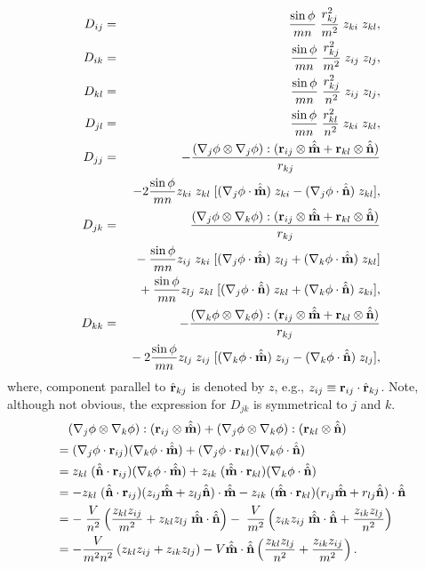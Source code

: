 \documentclass{article}
\begin{document}
\begin{eqnarray}
D_{ij} 
&=& \frac {\sin \phi} {mn} \; \frac {r_{kj}^2} {m^2} \;
  z_{ki} \; z_{kl}, \\
%
D_{ik} 
&=&  \frac {\sin \phi} {mn} \; \frac {r_{kj}^2} {m^2} \; 
  z_{ij} \; z_{lj}, \\
%
D_{kl}
&=& \frac {\sin \phi} {mn} \; \frac {r_{kj}^2}{n^2} \; 
  z_{ij} \; z_{lj} , \\
%
D_{jl}
&=& \frac {\sin \phi} {mn} \; \frac {r_{kl}^2} {n^2} \;
  z_{ki} \; z_{kl} , \\
%
D_{jj} 
&=& - \frac{
    (\djphi \otimes \djphi)  : 
    (\vr_{ij} \otimes \vmhh + \vr_{kl} \otimes \vnhh)
  } {r_{kj}} \nonumber \\
& & - 2 \frac {\sin \phi} {mn}  
  z_{ki} \; z_{kl} \;
  [
    (\djphi \cdot \vmhh) \; z_{ki}
   -(\djphi \cdot \vnhh) \; z_{kl}
  ], \\
%
D_{jk} 
&=&
\frac{ 
    (\djphi \otimes \dkphi)  : 
    (\vr_{ij} \otimes \vmhh + \vr_{kl} \otimes \vnhh)
} {r_{kj}} \nonumber \\
& & 
{} -\frac {\sin \phi} {mn}
  z_{ij} \; z_{ki} \;
  [
    (\djphi \cdot \vmhh) \; z_{lj}
   +(\dkphi \cdot \vmhh) \; z_{kl}
  ] \nonumber \\
& &
 {} +\frac {\sin \phi} {mn}
  z_{lj} \; z_{kl} \;
  [
    (\djphi \cdot \vnhh) \; z_{kl}
   +(\dkphi \cdot \vnhh) \; z_{ki}
  ], \\
%
D_{kk}
&=& - \frac{
    (\dkphi \otimes \dkphi)  : 
    (\vr_{ij} \otimes \vmhh + \vr_{kl} \otimes \vnhh)
  } {r_{kj}} \nonumber \\
& & {}- 2 \frac {\sin \phi} {mn}  
  z_{lj} \; z_{ij} \;
  [
    (\dkphi \cdot \vmhh) \; z_{ij}
   -(\dkphi \cdot \vnhh) \; z_{lj}
  ],
\end{eqnarray}
where, component parallel to $\hat{\mathbf{r}}_{kj}$ is denoted by $z$, e.g., 
$z_{ij} \equiv \mathbf{r}_{ij} \cdot \hat{\mathbf{r}}_{kj}$.
Note, although not obvious, the expression for $D_{jk}$ is symmetrical to $j$ and $k$. 
\begin{align*}
&\ \ \ (\nabla_j \phi \otimes \nabla_k \phi) : (\mathbf{r}_{ij} \otimes \hat{\hat{\mathbf{m}}})
+ (\nabla_j \phi \otimes \nabla_k \phi) : (\mathbf{r}_{kl} \otimes \hat{\hat{\mathbf{n}}}) \\
&= (\nabla_j \phi \cdot \mathbf{r}_{ij})
  (\nabla_k \phi \cdot \hat{\hat{\mathbf{m}}})
+ (\nabla_j \phi \cdot \mathbf{r}_{kl})
  (\nabla_k \phi \cdot \hat{\hat{\mathbf{n}}}) \\
&= z_{kl} \; (\hat{\hat{\mathbf{n}}} \cdot \mathbf{r}_{ij})
  (\nabla_k \phi \cdot \hat{\hat{\mathbf{m}}} ) 
+  z_{ik} \; (\hat{\hat{\mathbf{m}}} \cdot \mathbf{r}_{kl})
  (\nabla_k \phi \cdot \hat{\hat{\mathbf{n}}} ) \\
&= -z_{kl} \; (\hat{\hat{\mathbf{n}}} \cdot \mathbf{r}_{ij})
   (z_{ij} \hat{\hat{\mathbf{m}}} + z_{lj} \hat{\hat{\mathbf{n}}}) \cdot \hat{\hat{\mathbf{m}}} 
-  z_{ik} \; (\hat{\hat{\mathbf{m}}} \cdot \mathbf{r}_{kl})
   (r_{ij} \hat{\hat{\mathbf{m}}} + r_{lj} \hat{\hat{\mathbf{n}}}) \cdot \hat{\hat{\mathbf{n}}} \\
&= - \; \frac{V}{n^2}
  \left( 
    \frac {z_{kl} z_{ij}}{m^2} +
    z_{kl} z_{lj} \; \hat{\hat{\mathbf{m}}} \cdot \hat{\hat{\mathbf{n}}} 
  \right)
- \; \frac{V}{m^2}
  \left( 
    z_{ik} z_{ij} \; \hat{\hat{\mathbf{m}}} \cdot \hat{\hat{\mathbf{n}}} +
    \frac {z_{ik} z_{lj}} {n^2} 
  \right) \\  
&= - \frac{V}{m^2 n^2} 
  \left(
    z_{kl} z_{ij} + z_{ik} z_{lj}
  \right)
   - V \hat{\hat{\mathbf{m}}} \cdot \hat{\hat{\mathbf{n}}}
   \left(
     \frac {z_{kl} z_{lj}} {n^2} 
    +\frac {z_{ik} z_{ij}} {m^2} 
   \right).
\end{align*}
%
\end{document}
